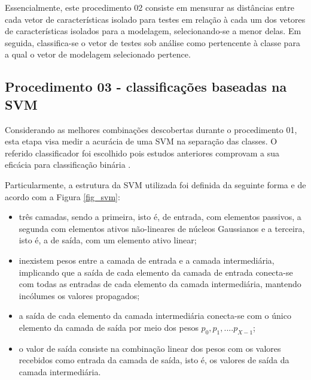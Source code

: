 		\par Essencialmente, este procedimento 02 consiste em mensurar as distâncias entre cada vetor de características isolado para testes em relação à cada um dos vetores de características isolados para a modelagem, selecionando-se a menor delas. Em seguida, classifica-se o vetor de testes sob análise como pertencente à classe para a qual o vetor de modelagem selecionado pertence.   
								
		

		\subsection{Procedimento 03 - classificações baseadas na SVM}
		\label{chap:propApproach:sec:Experimento03}
		\par Considerando as melhores combinações descobertas durante o procedimento 01, esta etapa visa medir a acurácia de uma SVM na separação das classes. O referido classificador foi escolhido pois estudos anteriores comprovam a sua eficácia para classificação binária \cite{XXXXXX}. 
		
		\par Particularmente, a estrutura da SVM utilizada foi definida da seguinte forma e de acordo com a Figura \ref{fig_svm}: 
		\begin{itemize}
		\item{}três camadas, sendo a primeira, isto é, de entrada, com elementos passivos, a segunda com elementos ativos não-lineares de núcleos Gaussianos e a terceira, isto é, a de saída, com um elemento ativo linear; 
		\item{}inexistem pesos entre a camada de entrada e a camada intermediária, implicando que a saída de cada elemento da camada de entrada conecta-se com todas as entradas de cada elemento da camada intermediária, mantendo incólumes os valores propagados;
		\item{}a saída de cada elemento da camada intermediária conecta-se com o único elemento da camada de saída por meio dos pesos $p_0, p_1, .... p_{X-1}$;
		\item{}o valor de saída consiste na combinação linear dos pesos com os valores recebidos como entrada da camada de saída, isto é, os valores de saída da camada intermediária.
		\end{itemize}
		
